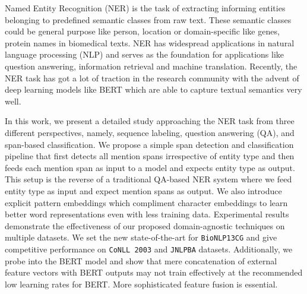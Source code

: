 Named Entity Recognition (NER) is the task of extracting informing entities belonging to predefined semantic classes from raw text. These semantic classes could be general purpose like person, location or domain-specific like genes, protein names in biomedical texts. NER has widespread applications in natural language processing (NLP) and serves as the foundation for applications like question answering, information retrieval and machine translation. Recently, the NER task has got a lot of traction in the research community with the advent of deep learning models like BERT which are able to capture textual semantics very well.

In this work, we present a detailed study approaching the NER task from three different perspectives, namely, sequence labeling, question answering (QA), and span-based classification. We propose a simple span detection and classification pipeline that first detects all mention spans irrespective of entity type and  then feeds each mention span as input to a model and expects entity type as output. This setup is the reverse of a traditional QA-based NER system where we feed entity type as input and expect mention spans as output. We also introduce explicit pattern embeddings which compliment character embeddings to learn better word representations even with less training data. Experimental results demonstrate the effectiveness of our proposed domain-agnostic techniques on multiple datasets. We set the new state-of-the-art for \texttt{BioNLP13CG} and give competitive performance on \texttt{CoNLL 2003} and \texttt{JNLPBA} datasets. Additionally, we probe into the BERT model and show that mere concatenation of external feature vectors with BERT outputs may not train effectively at the recommended low learning rates for BERT. More sophisticated feature fusion is essential.
